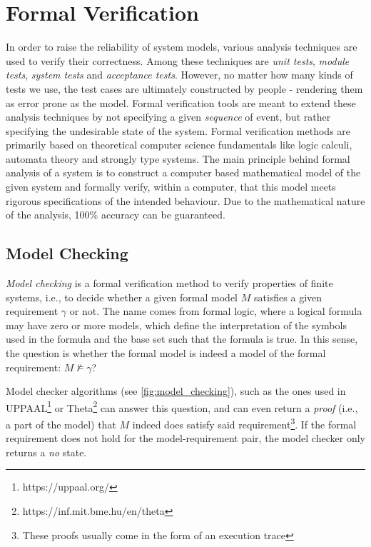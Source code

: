 \section{Formal Verification}\label{sec:formal_verification}

In order to raise the reliability of system models, various analysis techniques are used to verify their correctness. Among these techniques are \emph{unit tests}, \emph{module tests}, \emph{system tests} and \emph{acceptance tests}. However, no matter how many kinds of tests we use, the test cases are ultimately constructed by people - rendering them as error prone as the model. Formal verification tools are meant to extend these analysis techniques by not specifying a given \emph{sequence} of event, but rather specifying the undesirable state of the system. Formal verification methods are primarily based on theoretical computer science fundamentals like logic calculi, automata theory and strongly type systems. The main principle behind formal analysis of a system is to construct a computer based mathematical model of the given system and formally verify, within a computer, that this model meets rigorous specifications of the intended behaviour. Due to the mathematical nature of the analysis, 100\% accuracy can be guaranteed.

\subsection{Model Checking}

\emph{Model checking} is a formal verification method to verify properties of finite systems, i.e., to decide whether a given formal model \(M\) satisfies a given requirement \(\gamma\) or not. The name comes from formal logic, where a logical formula may have zero or more models, which define the interpretation of the symbols used in the formula and the base set such that the formula is true. In this sense, the question is whether the formal model is indeed a model of the formal requirement: \(M \not\models \gamma\)?

Model checker algorithms (see \autoref{fig:model_checking}), such as the ones used in UPPAAL\footnote{https://uppaal.org/} \cite{uppaal} or Theta\footnote{https://inf.mit.bme.hu/en/theta} \cite{theta} can answer this question, and can even return a \emph{proof} (i.e., a part of the model) that \(M\) indeed does satisfy said requirement\footnote{These proofs usually come in the form of an execution trace}. If the formal requirement does not hold for the model-requirement pair, the model checker only returns a \emph{no} state.

